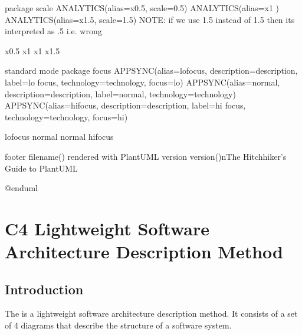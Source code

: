\documentclass[letterpaper,10pt,english]{sphinxmanual}
\begin{document}
\begin{sphinxVerbatim}[commandchars=\\\{\},numbers=left,firstnumber=1,stepnumber=1]
package scale \PYGZob{}
\PYGZdl{}ANALYTICS(\PYGZdl{}alias=\PYGZdq{}x0.5\PYGZdq{}, \PYGZdl{}scale=\PYGZdq{}0.5\PYGZdq{})
\PYGZdl{}ANALYTICS(\PYGZdl{}alias=\PYGZdq{}x1\PYGZdq{} )
\PYGZdl{}ANALYTICS(\PYGZdl{}alias=\PYGZdq{}x1.5\PYGZdq{}, \PYGZdl{}scale=\PYGZdq{}1.5\PYGZdq{})
\PYGZsq{}NOTE: if we use 1.5 instead of \PYGZdq{}1.5\PYGZdq{} then it\PYGZsq{}s interpreted as .5 i.e. wrong

x0.5 \PYGZhy{}\PYGZhy{}\PYGZgt{}x1
x1\PYGZhy{}\PYGZhy{}\PYGZgt{} x1.5
\PYGZcb{}

\PYGZsq{}standard mode
package focus \PYGZob{}
\PYGZdl{}APPSYNC(\PYGZdl{}alias=\PYGZdq{}lofocus\PYGZdq{}, \PYGZdl{}description=\PYGZdq{}description\PYGZdq{}, \PYGZdl{}label=\PYGZdq{}lo focus\PYGZdq{}, \PYGZdl{}technology=\PYGZdq{}technology\PYGZdq{}, \PYGZdl{}focus=\PYGZdq{}lo\PYGZdq{})
\PYGZdl{}APPSYNC(\PYGZdl{}alias=\PYGZdq{}normal\PYGZdq{}, \PYGZdl{}description=\PYGZdq{}description\PYGZdq{}, \PYGZdl{}label=\PYGZdq{}normal\PYGZdq{}, \PYGZdl{}technology=\PYGZdq{}technology\PYGZdq{})
\PYGZdl{}APPSYNC(\PYGZdl{}alias=\PYGZdq{}hifocus\PYGZdq{}, \PYGZdl{}description=\PYGZdq{}description\PYGZdq{}, \PYGZdl{}label=\PYGZdq{}hi focus\PYGZdq{}, \PYGZdl{}technology=\PYGZdq{}technology\PYGZdq{}, \PYGZdl{}focus=\PYGZdq{}hi\PYGZdq{})

lofocus \PYGZhy{}\PYGZhy{}\PYGZgt{}normal
normal\PYGZhy{}\PYGZhy{}\PYGZgt{} hifocus
\PYGZcb{}



footer \PYGZpc{}filename() rendered with PlantUML version \PYGZpc{}version()\PYGZbs{}nThe Hitchhiker’s Guide to PlantUML

@enduml
\end{sphinxVerbatim}
\sphinxresetverbatimhllines


\section{C4 Lightweight Software Architecture Description Method}
\label{\detokenize{C4/c4:c4-lightweight-software-architecture-description-method}}\label{\detokenize{C4/c4:c4-label}}\label{\detokenize{C4/c4::doc}}

\subsection{Introduction}
\label{\detokenize{C4/c4:introduction}}
The  is a lightweight software
architecture description method. It consists of a set of 4 diagrams that
describe the  structure of a software system.
\end{document}
